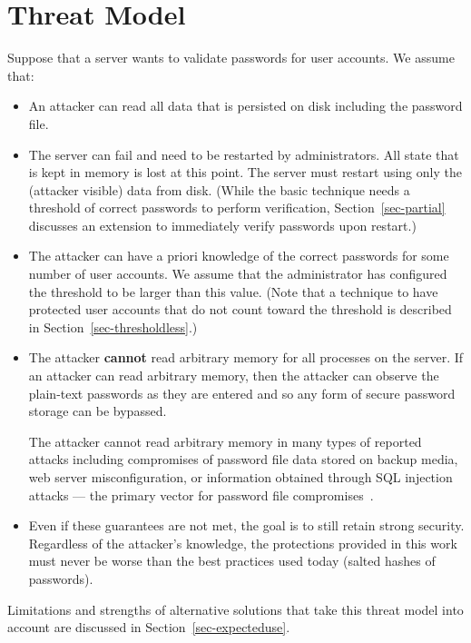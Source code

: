 \section{Threat Model}
\label{sec-threatmodel}

Suppose that a server wants to validate passwords for user accounts.   
We assume that:

\begin{itemize}

\item An attacker can read all data that is persisted on disk including
the password file.

\item The server can fail and need to be restarted by administrators.   All
state that is kept in memory is lost at this point.   The server must
restart using only the (attacker visible) data from disk.   (While the basic
technique needs a threshold of correct passwords to perform verification, 
Section~\ref{sec-partial} discusses an extension to immediately verify
passwords upon restart.)

\item The attacker can have a priori knowledge of the correct
passwords for some number of user accounts.   We assume
that the administrator has configured the threshold to be larger than this
value.   (Note that a technique to have protected user accounts that
do not count toward the threshold is described in 
Section~\ref{sec-thresholdless}.)

\item 
The attacker {\bf cannot} read arbitrary memory for all processes on the 
server.  
If an attacker can read arbitrary memory, then the attacker can observe
the plain-text passwords as they are entered and so any form of secure password
storage can be bypassed.

The attacker cannot read arbitrary memory in many types of reported attacks
including compromises of password file data stored on 
backup media, web server misconfiguration, or information obtained through SQL 
injection attacks --- the primary vector for password file 
compromises~\cite{passwordresearchblog, miranteTR13}.

\item
Even if these guarantees are not met, the goal is to still retain
strong security.   Regardless of the attacker's knowledge, the protections
provided in this work must never be worse than the best practices used today 
(salted hashes of passwords).

\end{itemize}

Limitations and strengths of alternative solutions that take this threat 
model into account are discussed in Section~\ref{sec-expecteduse}.
